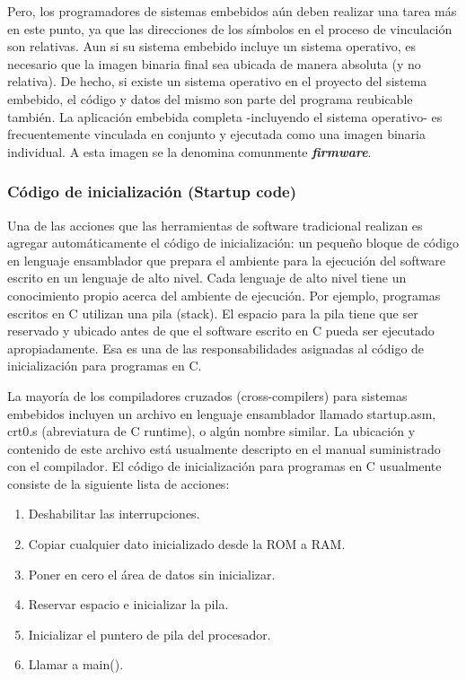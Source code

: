 \documentclass[output=paper, 
colorlinks,
citecolor=brown,
newtxmath
]{langscibook}
\begin{document}
Pero, los programadores de sistemas embebidos aún deben realizar una
tarea más en este punto, ya que 
las direcciones de los símbolos en el proceso de vinculación son relativas.
Aun si su sistema embebido incluye un sistema operativo, es necesario
que la imagen binaria final sea ubicada de manera absoluta (y no relativa).
De hecho, si existe un sistema operativo en el proyecto del sistema embebido,
el código y datos del mismo son parte del programa reubicable 
también.
La aplicación embebida completa -incluyendo el sistema operativo- es
frecuentemente vinculada en conjunto y ejecutada como una imagen binaria
individual. A esta imagen se la denomina comunmente \textit{\textbf{firmware}}.

\subsubsection {Código de inicialización (Startup code)}

Una de las acciones que las herramientas de software tradicional realizan
es agregar automáticamente el código de inicialización: un pequeño bloque
de código en lenguaje ensamblador que prepara el ambiente para la ejecución
del software escrito en un lenguaje de alto nivel. Cada lenguaje de alto
nivel tiene un conocimiento propio acerca del ambiente de ejecución.
Por ejemplo, programas escritos en C utilizan una pila (stack). El espacio
para la pila tiene que ser reservado y ubicado antes de que el software escrito
en C pueda ser ejecutado apropiadamente. Esa es una de las responsabilidades
asignadas al código de inicialización para programas en C.

La mayoría de los compiladores cruzados (cross-compilers) para sistemas
embebidos incluyen un archivo en lenguaje ensamblador llamado startup.asm, crt0.s
(abreviatura de C runtime), o algún nombre similar. La ubicación y contenido de este
archivo está usualmente descripto en el manual suministrado con el 
compilador. El código de inicialización para programas en C usualmente 
consiste de la siguiente
lista de acciones:

\begin{enumerate}
\item Deshabilitar las interrupciones.
\item Copiar cualquier dato inicializado desde la ROM a RAM.
\item Poner en cero el área de datos sin inicializar.
\item Reservar espacio e inicializar la pila.
\item Inicializar el puntero de pila del procesador.
\item Llamar a main().
\end{enumerate}
\end{document}

